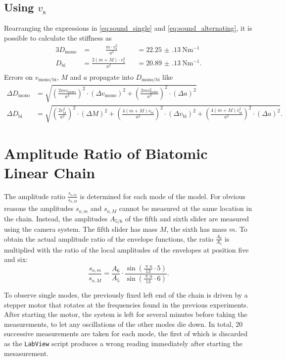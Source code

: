 \subsection{Using $v_\text{s}$}
Rearranging the expressions in \ref{eq:sound_single} and \ref{eq:sound_alternating}, it is possible to calculate the stiffness as
\begin{alignat*}{3}
	D_\text{mono} &=\qquad \frac{m\cdot v_\text{s}^2}{a^2} &&=  \SI{22.25(13)}{\newton\meter^{-1}} \\
	D_\text{bi} &= \frac{2(m+M)\cdot v_\text{s}^2}{a^2} &&= \SI{20.89(13)}{\newton\meter^{-1}}. \\
\end{alignat*}
Errors on $v_\text{mono/bi}$, $M$ and $a$ propagate into $D_\text{mono/bi}$ like
\begin{align*}
	\Delta D_\text{mono} &= \sqrt{ \left(\frac{2mv_\text{mono}}{a^2}\right)^2 \cdot(\Delta v_\text{mono})^2 + \left(\frac{2mv_\text{mono}^2}{a^3}\right)^2 \cdot (\Delta a)^2 } \\
	\Delta D_\text{bi} &= \sqrt{ \left(\frac{2v_\text{bi}^2}{a^2}\right)^2 \cdot (\Delta M)^2
	+ \left(\frac{4(m+M)v_\text{bi}}{a^2}\right)^2 \cdot (\Delta v_\text{bi})^2
	+ \left(\frac{4(m+M)v_\text{bi}^2}{a^3}\right)^2 \cdot (\Delta a)^2 }.
\end{align*}

\section{Amplitude Ratio of Biatomic Linear Chain}
The amplitude ratio $\frac{s_{o,m}}{s_{o,M}}$ is determined for each mode of the model.
For obvious reasons the amplitudes $s_{o,m}$ and $s_{o,M}$ cannot be measured at the same location in the chain.
Instead, the amplitudes $A_{5/6}$ of the fifth and sixth slider are measured using the camera system.
The fifth slider has mass $M$, the sixth has mass $m$.
To obtain the actual amplitude ratio of the envelope functions, the ratio $\frac{A_{6}}{A_{5}}$ is multiplied with the ratio of the local amplitudes of the envelopes at position five and six:
\begin{equation*}
	\frac{s_{o,m}}{s_{o,M}} = \frac{A_{6}}{A_{5}} \cdot \frac{\sin(\frac{\uppi n}{13} \cdot 5)}{\sin(\frac{\uppi n}{13} \cdot 6)}.
\end{equation*}

To observe single modes, the previously fixed left end of the chain is driven by a stepper motor that rotates at the frequencies found in the previous experiments.
After starting the motor, the system is left for several minutes before taking the measurements, to let any oscillations of the other modes die down.
In total, 20 successive measurements are taken for each mode, the first of which is discarded as the \texttt{LabView} script produces a wrong reading immediately after starting the mesasurement.

